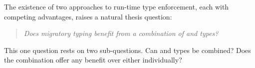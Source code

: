
The existence of two approaches to run-time type enforcement,
 each with competing advantages, raises a natural thesis question:

\begin{quote}
  \emph{Does migratory typing benefit from a combination of \tdeep{} and \tshallow{} types?}
\end{quote}

This one question rests on two sub-questions.
Can \tdeep{} and \tshallow{} types be combined?
Does the combination offer any benefit over either individually?

